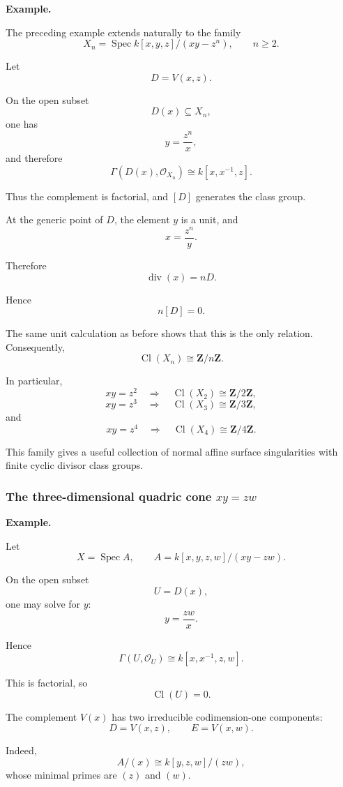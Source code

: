 \documentclass[12pt,a4paper]{article}
\theoremstyle{notespace}
\begin{document}
\textbf{Example.}

The preceding example extends naturally to the family
\[
X_n
=
\operatorname{Spec}
k[x,y,z]/(xy-z^n),
\qquad n\geq 2.
\]

Let
\[
D=V(x,z).
\]

On the open subset
\[
D(x)\subseteq X_n,
\]
one has
\[
y=\frac{z^n}{x},
\]
and therefore
\[
\Gamma(D(x),\mathcal O_{X_n})
\cong
k[x,x^{-1},z].
\]

Thus the complement is factorial, and \([D]\) generates the class group.

At the generic point of \(D\), the element \(y\) is a unit, and
\[
x=\frac{z^n}{y}.
\]

Therefore
\[
\operatorname{div}(x)=nD.
\]

Hence
\[
n[D]=0.
\]

The same unit calculation as before shows that this is the only relation. Consequently,
\[
\boxed{
	\operatorname{Cl}(X_n)\cong\mathbf Z/n\mathbf Z.
}
\]

In particular,
\[
xy=z^2
\quad\Longrightarrow\quad
\operatorname{Cl}(X_2)\cong\mathbf Z/2\mathbf Z,
\]
\[
xy=z^3
\quad\Longrightarrow\quad
\operatorname{Cl}(X_3)\cong\mathbf Z/3\mathbf Z,
\]
and
\[
xy=z^4
\quad\Longrightarrow\quad
\operatorname{Cl}(X_4)\cong\mathbf Z/4\mathbf Z.
\]

This family gives a useful collection of normal affine surface singularities with finite cyclic divisor class groups.

\subsubsection{\texorpdfstring{The three-dimensional quadric cone \(xy=zw\)}{The quadric cone xy=zw}}

\textbf{Example.}

Let
\[
X=\operatorname{Spec}A,
\qquad
A=k[x,y,z,w]/(xy-zw).
\]

On the open subset
\[
U=D(x),
\]
one may solve for \(y\):
\[
y=\frac{zw}{x}.
\]

Hence
\[
\Gamma(U,\mathcal O_U)
\cong
k[x,x^{-1},z,w].
\]

This is factorial, so
\[
\operatorname{Cl}(U)=0.
\]

The complement \(V(x)\) has two irreducible codimension-one components:
\[
D=V(x,z),
\qquad
E=V(x,w).
\]

Indeed,
\[
A/(x)
\cong
k[y,z,w]/(zw),
\]
whose minimal primes are \((z)\) and \((w)\).
\end{document}
